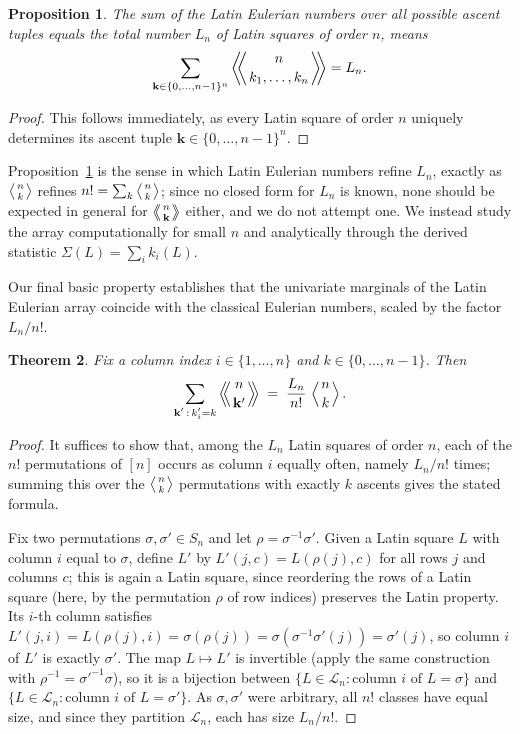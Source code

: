 \documentclass[11pt]{amsart}
\newtheorem{theorem}{Theorem}[section]
\newtheorem{proposition}[theorem]{Proposition}
\newcommand{\LE}[1]{\left\langle\!\!\left\langle #1 \right\rangle\!\!\right\rangle}
\newcommand{\EN}[1]{\left\langle #1 \right\rangle}
\begin{document}
\begin{proposition}\label{prop:sum}
The sum of the Latin Eulerian numbers over all possible ascent tuples equals the total number $L_n$ of Latin squares of order $n$, means
\[
\sum_{\mathbf{k}\in\{0,\dots,n-1\}^n} \LE{n\atop k_1,\dots,k_n} = L_n.
\]
\end{proposition}
\begin{proof}
This follows immediately, as every Latin square of order $n$ uniquely determines its ascent tuple $\mathbf{k} \in \{0, \dots, n-1\}^n$.
\end{proof}
Proposition~\ref{prop:sum} is the sense in which Latin Eulerian numbers refine $L_n$, exactly as $\EN{n\atop k}$ refines $n!=\sum_k \EN{n\atop k}$; since no closed form for $L_n$ is known, none should be expected in general for $\LE{n\atop \mathbf k}$ either, and we do not attempt one. We instead study the array computationally for small $n$ and analytically through the derived statistic $\Sigma(L)=\sum_i k_i(L)$.

Our final basic property establishes that the univariate marginals of the Latin Eulerian array coincide with the classical Eulerian numbers, scaled by the factor $L_n / n!$.
\begin{theorem}\label{thm:marginal}
Fix a column index $i\in\{1,\dots,n\}$ and $k\in\{0,\dots,n-1\}$. Then
\[
\sum_{\substack{\mathbf k'\,:\,k'_i=k}} \LE{n\atop \mathbf k'} \;=\; \frac{L_n}{n!}\,\EN{n\atop k}.
\]
\end{theorem}
\begin{proof}
It suffices to show that, among the $L_n$ Latin squares of order $n$, each of the $n!$ permutations of $[n]$ occurs as column $i$ equally often, namely $L_n/n!$ times; summing this over the $\EN{n\atop k}$ permutations with exactly $k$ ascents gives the stated formula.

Fix two permutations $\sigma,\sigma'\in S_n$ and let $\rho=\sigma^{-1}\sigma'$. Given a Latin square $L$ with column $i$ equal to $\sigma$, define $L'$ by $L'(j,c)=L(\rho(j),c)$ for all rows $j$ and columns $c$; this is again a Latin square, since reordering the rows of a Latin square (here, by the permutation $\rho$ of row indices) preserves the Latin property. Its $i$-th column satisfies $L'(j,i)=L(\rho(j),i)=\sigma(\rho(j))=\sigma(\sigma^{-1}\sigma'(j))=\sigma'(j)$, so column $i$ of $L'$ is exactly $\sigma'$. The map $L\mapsto L'$ is invertible (apply the same construction with $\rho^{-1}=\sigma'^{-1}\sigma$), so it is a bijection between $\{L\in\mathcal L_n : \text{column }i\text{ of }L=\sigma\}$ and $\{L\in\mathcal L_n:\text{column }i\text{ of }L=\sigma'\}$. As $\sigma,\sigma'$ were arbitrary, all $n!$ classes have equal size, and since they partition $\mathcal L_n$, each has size $L_n/n!$.
\end{proof}
%
\end{document}
